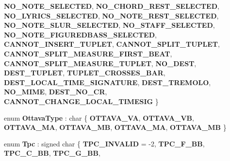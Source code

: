 \begin{DoxyCompactItemize}
{\bfseries N\+O\+\_\+\+N\+O\+T\+E\+\_\+\+S\+E\+L\+E\+C\+T\+ED}, 
{\bfseries N\+O\+\_\+\+C\+H\+O\+R\+D\+\_\+\+R\+E\+S\+T\+\_\+\+S\+E\+L\+E\+C\+T\+ED}, 
{\bfseries N\+O\+\_\+\+L\+Y\+R\+I\+C\+S\+\_\+\+S\+E\+L\+E\+C\+T\+ED}, 
\newline
{\bfseries N\+O\+\_\+\+N\+O\+T\+E\+\_\+\+R\+E\+S\+T\+\_\+\+S\+E\+L\+E\+C\+T\+ED}, 
{\bfseries N\+O\+\_\+\+N\+O\+T\+E\+\_\+\+S\+L\+U\+R\+\_\+\+S\+E\+L\+E\+C\+T\+ED}, 
{\bfseries N\+O\+\_\+\+S\+T\+A\+F\+F\+\_\+\+S\+E\+L\+E\+C\+T\+ED}, 
{\bfseries N\+O\+\_\+\+N\+O\+T\+E\+\_\+\+F\+I\+G\+U\+R\+E\+D\+B\+A\+S\+S\+\_\+\+S\+E\+L\+E\+C\+T\+ED}, 
\newline
{\bfseries C\+A\+N\+N\+O\+T\+\_\+\+I\+N\+S\+E\+R\+T\+\_\+\+T\+U\+P\+L\+ET}, 
{\bfseries C\+A\+N\+N\+O\+T\+\_\+\+S\+P\+L\+I\+T\+\_\+\+T\+U\+P\+L\+ET}, 
{\bfseries C\+A\+N\+N\+O\+T\+\_\+\+S\+P\+L\+I\+T\+\_\+\+M\+E\+A\+S\+U\+R\+E\+\_\+\+F\+I\+R\+S\+T\+\_\+\+B\+E\+AT}, 
{\bfseries C\+A\+N\+N\+O\+T\+\_\+\+S\+P\+L\+I\+T\+\_\+\+M\+E\+A\+S\+U\+R\+E\+\_\+\+T\+U\+P\+L\+ET}, 
\newline
{\bfseries N\+O\+\_\+\+D\+E\+ST}, 
{\bfseries D\+E\+S\+T\+\_\+\+T\+U\+P\+L\+ET}, 
{\bfseries T\+U\+P\+L\+E\+T\+\_\+\+C\+R\+O\+S\+S\+E\+S\+\_\+\+B\+AR}, 
{\bfseries D\+E\+S\+T\+\_\+\+L\+O\+C\+A\+L\+\_\+\+T\+I\+M\+E\+\_\+\+S\+I\+G\+N\+A\+T\+U\+RE}, 
\newline
{\bfseries D\+E\+S\+T\+\_\+\+T\+R\+E\+M\+O\+LO}, 
{\bfseries N\+O\+\_\+\+M\+I\+ME}, 
{\bfseries D\+E\+S\+T\+\_\+\+N\+O\+\_\+\+CR}, 
{\bfseries C\+A\+N\+N\+O\+T\+\_\+\+C\+H\+A\+N\+G\+E\+\_\+\+L\+O\+C\+A\+L\+\_\+\+T\+I\+M\+E\+S\+IG}
 \}
\item 
\mbox{\label{namespace_ms_a8fa9ce71e2e532dc3509dc739780990c}} 
enum {\bfseries Ottava\+Type} \+: char \{ \newline
{\bfseries O\+T\+T\+A\+V\+A\+\_\+VA}, 
{\bfseries O\+T\+T\+A\+V\+A\+\_\+VB}, 
{\bfseries O\+T\+T\+A\+V\+A\+\_\+MA}, 
{\bfseries O\+T\+T\+A\+V\+A\+\_\+MB}, 
\newline
{\bfseries O\+T\+T\+A\+V\+A\+\_\+MA}, 
{\bfseries O\+T\+T\+A\+V\+A\+\_\+MB}
 \}
\item 
\mbox{\label{namespace_ms_af0c3d8c9a95bedee2dd113a73cefa4c7}} 
enum {\bfseries Tpc} \+: signed char \{ \newline
{\bfseries T\+P\+C\+\_\+\+I\+N\+V\+A\+L\+ID} = -\/2, 
{\bfseries T\+P\+C\+\_\+\+F\+\_\+\+BB}, 
{\bfseries T\+P\+C\+\_\+\+C\+\_\+\+BB}, 
{\bfseries T\+P\+C\+\_\+\+G\+\_\+\+BB}, 

\end{DoxyCompactItemize}
